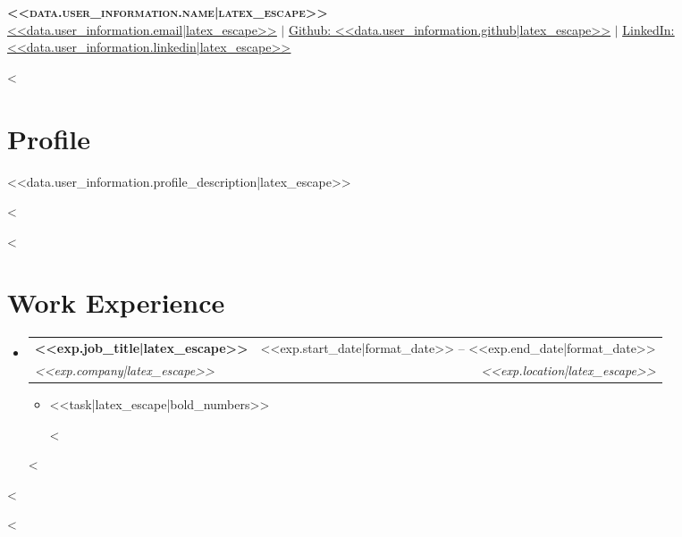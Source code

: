\documentclass[letterpaper,11pt]{article}
\makeatletter
\newcommand{\resumeItem}[1]{
  \item\small{
    {#1 \vspace{-2pt}}
  }
}
\newcommand{\resumeSubheading}[4]{
  \vspace{-2pt}\item
    \begin{tabular*}{0.97\textwidth}[t]{l@{\extracolsep{\fill}}r}
      \textbf{#1} & #2 \\
      \textit{\small#3} & \textit{\small #4} \\
    \end{tabular*}\vspace{-7pt}
}
\newcommand{\resumeSubHeadingListStart}{\begin{itemize}[leftmargin=0.15in, label={}]}
\newcommand{\resumeSubHeadingListEnd}{\end{itemize}}
\newcommand{\resumeItemListStart}{\begin{itemize}}
\newcommand{\resumeItemListEnd}{\end{itemize}\vspace{-5pt}}
\makeatother
\begin{document}
\begin{center}
    \textbf{\Huge \scshape <<data.user_information.name|latex_escape>>} \\ \vspace{1pt}
    \href{mailto:<<data.user_information.email|latex_escape>>}{\underline{<<data.user_information.email|latex_escape>>}} $|$
    \href{https://github.com/<<data.user_information.github|latex_escape>>}{\underline{Github: <<data.user_information.github|latex_escape>>}} $|$
    \href{https://www.linkedin.com/in/<<data.user_information.linkedin|latex_escape|lower|replace(" ", "-")>>}{\underline{LinkedIn: <<data.user_information.linkedin|latex_escape>>}}
\end{center}

<%
\section{Profile}
 \begin{itemize}[leftmargin=0.15in, label={}]
    \small{\item{
     <<data.user_information.profile_description|latex_escape>>
    }}
 \end{itemize}
<%

<%
\section{Work Experience}
  \resumeSubHeadingListStart
    <%
    \resumeSubheading
      {<<exp.job_title|latex_escape>>}{<<exp.start_date|format_date>> -- <<exp.end_date|format_date>>}
      {<<exp.company|latex_escape>>}{<<exp.location|latex_escape>>}
      \resumeItemListStart
        <%
        \resumeItem{<<task|latex_escape|bold_numbers>>}
        <%
      \resumeItemListEnd
    <%
  \resumeSubHeadingListEnd
<%

<%
\end{document}
